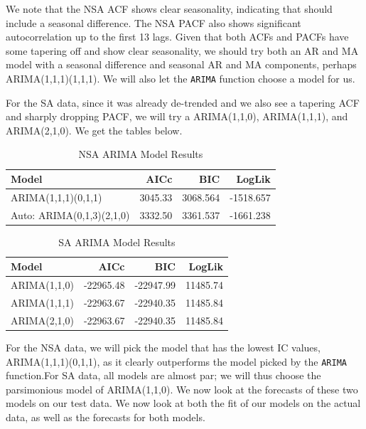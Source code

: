 \documentclass[
]{article}
\begin{document}
We note that the NSA ACF shows clear seasonality, indicating that should include a seasonal difference. The NSA PACF also shows significant autocorrelation up to the first 13 lags. Given that both ACFs and PACFs have some tapering off and show clear seasonality, we should try both an AR and MA model with a seasonal difference and seasonal AR and MA components, perhaps ARIMA(1,1,1)(1,1,1). We will also let the \texttt{ARIMA} function choose a model for us.

For the SA data, since it was already de-trended and we also see a tapering ACF and sharply dropping PACF, we will try a ARIMA(1,1,0), ARIMA(1,1,1), and ARIMA(2,1,0). We get the tables below.

\begin{table}[H]
\centering
\caption{\label{tab:nsa-table}NSA ARIMA Model Results}
\centering
\fontsize{9}{11}\selectfont
\begin{tabular}[t]{l|r|r|r}
\hline
Model & AICc & BIC & LogLik\\
\hline
ARIMA(1,1,1)(0,1,1) & 3045.33 & 3068.564 & -1518.657\\
\hline
Auto: ARIMA(0,1,3)(2,1,0) & 3332.50 & 3361.537 & -1661.238\\
\hline
\end{tabular}
\end{table}

\begin{table}[H]
\centering
\caption{\label{tab:sa-table}SA ARIMA Model Results}
\centering
\fontsize{9}{11}\selectfont
\begin{tabular}[t]{l|r|r|r}
\hline
Model & AICc & BIC & LogLik\\
\hline
ARIMA(1,1,0) & -22965.48 & -22947.99 & 11485.74\\
\hline
ARIMA(1,1,1) & -22963.67 & -22940.35 & 11485.84\\
\hline
ARIMA(2,1,0) & -22963.67 & -22940.35 & 11485.84\\
\hline
\end{tabular}
\end{table}

For the NSA data, we will pick the model that has the lowest IC values, ARIMA(1,1,1)(0,1,1), as it clearly outperforms the model picked by the \texttt{ARIMA} function.For SA data, all models are almost par; we will thus choose the parsimonious model of ARIMA(1,1,0). We now look at the forecasts of these two models on our test data. We now look at both the fit of our models on the actual data, as well as the forecasts for both models.
\end{document}
